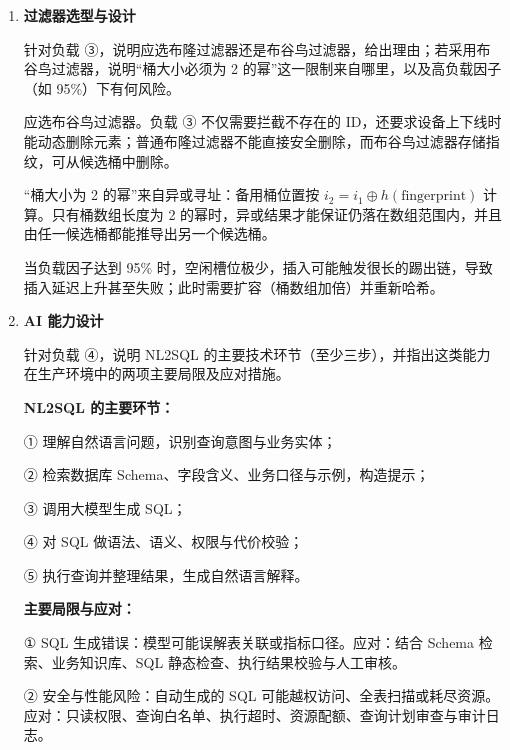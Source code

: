 \documentclass[UTF8,a4paper,11pt]{ctexart}
\newenvironment{answer}%
  {\begin{ans}\noindent{\bfseries\color{ansframe}【答案】}\hspace{0.4em}}%
  {\end{ans}}
\begin{document}
\begin{enumerate}
\begin{enumerate}
\item \textbf{过滤器选型与设计}\par
针对负载 ③，说明应选布隆过滤器还是布谷鸟过滤器，给出理由；若采用布谷鸟过滤器，说明“桶大小必须为 2 的幂”这一限制来自哪里，以及高负载因子（如 95\%）下有何风险。
\begin{answer}
应选布谷鸟过滤器。负载 ③ 不仅需要拦截不存在的 ID，还要求设备上下线时能动态删除元素；普通布隆过滤器不能直接安全删除，而布谷鸟过滤器存储指纹，可从候选桶中删除。\par
“桶大小为 2 的幂”来自异或寻址：备用桶位置按 $i_2 = i_1 \oplus h(\text{fingerprint})$ 计算。只有桶数组长度为 2 的幂时，异或结果才能保证仍落在数组范围内，并且由任一候选桶都能推导出另一个候选桶。\par
当负载因子达到 95\% 时，空闲槽位极少，插入可能触发很长的踢出链，导致插入延迟上升甚至失败；此时需要扩容（桶数组加倍）并重新哈希。
\end{answer}

\item \textbf{AI 能力设计}\par
针对负载 ④，说明 NL2SQL 的主要技术环节（至少三步），并指出这类能力在生产环境中的两项主要局限及应对措施。
\begin{answer}
\textbf{NL2SQL 的主要环节：}\par
① 理解自然语言问题，识别查询意图与业务实体；\par
② 检索数据库 Schema、字段含义、业务口径与示例，构造提示；\par
③ 调用大模型生成 SQL；\par
④ 对 SQL 做语法、语义、权限与代价校验；\par
⑤ 执行查询并整理结果，生成自然语言解释。\par
\textbf{主要局限与应对：}\par
① SQL 生成错误：模型可能误解表关联或指标口径。应对：结合 Schema 检索、业务知识库、SQL 静态检查、执行结果校验与人工审核。\par
② 安全与性能风险：自动生成的 SQL 可能越权访问、全表扫描或耗尽资源。应对：只读权限、查询白名单、执行超时、资源配额、查询计划审查与审计日志。
\end{answer}


\end{enumerate}
\end{enumerate}
\end{document}
